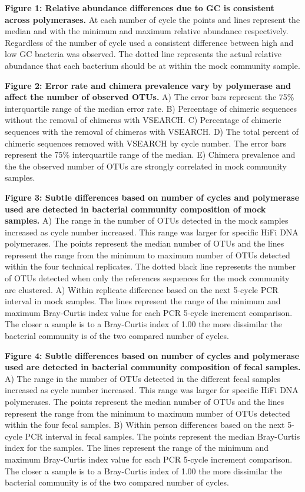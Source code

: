 \documentclass[11pt,]{article}
\begin{document}
\newpage

\textbf{Figure 1: Relative abundance differences due to GC is consistent
across polymerases.} At each number of cycle the points and lines
represent the median and with the minimum and maximum relative abundance
respectively. Regardless of the number of cycle used a consistent
difference between high and low GC bacteria was observed. The dotted
line represents the actual relative abundance that each bacterium should
be at within the mock community sample.

\textbf{Figure 2: Error rate and chimera prevalence vary by polymerase
and affect the number of observed OTUs.} A) The error bars represent the
75\% interquartile range of the median error rate. B) Percentage of
chimeric sequences without the removal of chimeras with VSEARCH. C)
Percentage of chimeric sequences with the removal of chimeras with
VSEARCH. D) The total percent of chimeric sequences removed with VSEARCH
by cycle number. The error bars represent the 75\% interquartile range
of the median. E) Chimera prevalence and the the observed number of OTUs
are strongly correlated in mock community samples.

\textbf{Figure 3: Subtle differences based on number of cycles and
polymerase used are detected in bacterial community composition of mock
samples.} A) The range in the number of OTUs detected in the mock
samples increased as cycle number increased. This range was larger for
specific HiFi DNA polymerases. The points represent the median number of
OTUs and the lines represent the range from the minimum to maximum
number of OTUs detected within the four technical replicates. The dotted
black line represents the number of OTUs detected when only the
references sequences for the mock community are clustered. A) Within
replicate difference based on the next 5-cycle PCR interval in mock
samples. The lines represent the range of the minimum and maximum
Bray-Curtis index value for each PCR 5-cycle increment comparison. The
closer a sample is to a Bray-Curtis index of 1.00 the more dissimilar
the bacterial community is of the two compared number of cycles.

\textbf{Figure 4: Subtle differences based on number of cycles and
polymerase used are detected in bacterial community composition of fecal
samples.} A) The range in the number of OTUs detected in the different
fecal samples increased as cycle number increased. This range was larger
for specific HiFi DNA polymerases. The points represent the median
number of OTUs and the lines represent the range from the minimum to
maximum number of OTUs detected within the four fecal samples. B) Within
person differences based on the next 5-cycle PCR interval in fecal
samples. The points represent the median Bray-Curtis index for the
samples. The lines represent the range of the minimum and maximum
Bray-Curtis index value for each PCR 5-cycle increment comparison. The
closer a sample is to a Bray-Curtis index of 1.00 the more dissimilar
the bacterial community is of the two compared number of cycles.
\end{document}
